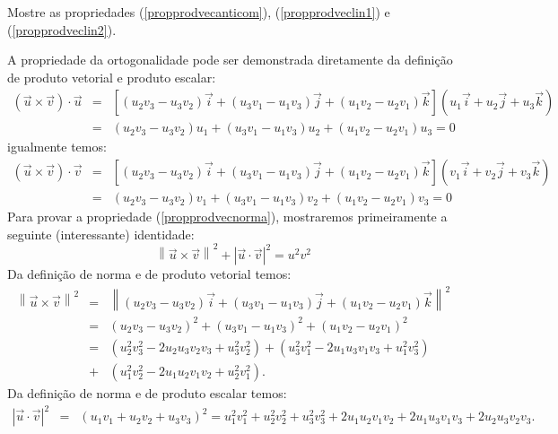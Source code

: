 \begin{exer} Mostre as propriedades (\ref{propprodvecanticom}), (\ref{propprodveclin1}) e (\ref{propprodveclin2}).
\end{exer}
A propriedade da ortogonalidade pode ser demonstrada diretamente da definição de produto vetorial e produto escalar:
\begin{eqnarray*}\left(\vec{u}\times \vec{v}\right)\cdot \vec{u}&=&\left[\left(u_2v_3-u_3v_2\right)\vec{i}+\left(u_3v_1-u_1v_3\right)\vec{j}+\left(u_1v_2-u_2v_1\right)\vec{k}\right]\left(u_1\vec{i}+u_2\vec{j}+u_3\vec{k}\right)\\
&=&\left(u_2v_3-u_3v_2\right)u_1+\left(u_3v_1-u_1v_3\right)u_2+\left(u_1v_2-u_2v_1\right)u_3=0
\end{eqnarray*}
igualmente temos:
\begin{eqnarray*}\left(\vec{u}\times \vec{v}\right)\cdot \vec{v}&=&\left[\left(u_2v_3-u_3v_2\right)\vec{i}+\left(u_3v_1-u_1v_3\right)\vec{j}+\left(u_1v_2-u_2v_1\right)\vec{k}\right]\left(v_1\vec{i}+v_2\vec{j}+v_3\vec{k}\right)\\
&=&\left(u_2v_3-u_3v_2\right)v_1+\left(u_3v_1-u_1v_3\right)v_2+\left(u_1v_2-u_2v_1\right)v_3=0
\end{eqnarray*}
Para provar a propriedade (\ref{propprodvecnorma}), mostraremos primeiramente a seguinte (interessante) identidade:
\begin{equation}\label{identnorma}\left\|\vec{u}\times \vec{v}\right\|^2+\left|\vec{u}\cdot \vec{v}\right|^2=u^2v^2
\end{equation}
Da definição de norma e de produto vetorial temos:
\begin{eqnarray}\label{calcnormaprodvec}
\left\|\vec{u}\times \vec{v}\right\|^2&=&\left\|\left(u_2v_3-u_3v_2\right)\vec{i}+\left(u_3v_1-u_1v_3\right)\vec{j}+\left(u_1v_2-u_2v_1\right)\vec{k}\right\|^2\nonumber\\
&=&\left(u_2v_3-u_3v_2\right)^2+\left(u_3v_1-u_1v_3\right)^2+\left(u_1v_2-u_2v_1\right)^2\nonumber\\
&=&\left(u_2^2v_3^2-2u_2u_3v_2v_3+u_3^2v_2^2\right)+\left(u_3^2v_1^2-2u_1u_3v_1v_3+u_1^2v_3^2\right) \nonumber\\
&+&\left(u_1^2v_2^2-2u_1u_2v_1v_2+u_2^2v_1^2\right).
\end{eqnarray}
Da definição de norma e de produto escalar temos:
\begin{eqnarray*}
\left|\vec{u}\cdot \vec{v}\right|^2&=&\left(u_1v_1+u_2v_2+u_3v_3\right)^2=u_1^2v_1^2+u_2^2v_2^2+u_3^2v_3^2+2u_1u_2v_1v_2+2u_1u_3v_1v_3+2u_2u_3v_2v_3.
\end{eqnarray*}
